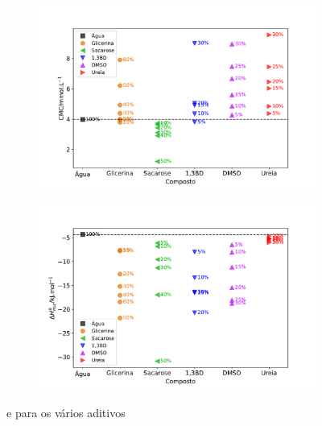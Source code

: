 		\begin{figure}[h]
			\begin{subfigure}[t]{0.5\textwidth}
				\centering
				\includegraphics[width=\textwidth]{imagens/itc/CMC_por_composto}
				\caption{\cmc}
				\label{fig:cmc_por_composto}
			\end{subfigure} %
			\begin{subfigure}[t]{0.5\textwidth}
				\centering
				\includegraphics[width=\textwidth]{imagens/itc/DH_por_composto}
				\caption{\DHmic}
				\label{fig:dh_por_composto}
			\end{subfigure}
		
			\caption{\cmc{} e \DHmic{} para os vários aditivos}
			\label{fig:cmc_dh_por_composto}
		\end{figure}

